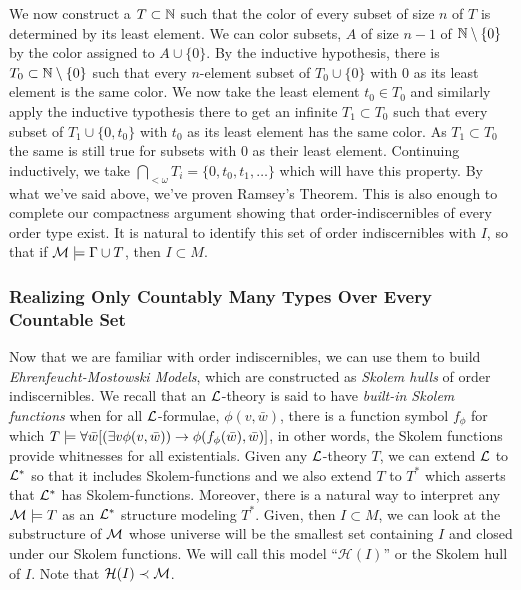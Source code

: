 We now construct a \(T \subset \mathbb{N}\) such that the color of every subset of size \(n\) of \(T\) is determined by its least element. 
We can color subsets, \(A\) of size \(n-1\) of \(\mathbb{N} \setminus \{0\}\) by the color assigned to \(A \cup \{0\}\). 
By the inductive hypothesis, there is \(T_0 \subset \mathbb{N} \setminus \{0\}\) such that every \(n\)-element subset of \(T_0 \cup \{0\}\) with 0 as its least element is the same color. 
We now take the least element \(t_0 \in T_0\) and similarly apply the inductive typothesis there to get an infinite \(T_1 \subset T_0\) such that every subset of \(T_1 \cup \{0, t_0\}\) with \(t_0\) as its least element has the same color. 
As \(T_1 \subset T_0\) the same is still true for subsets with \(0\) as their least element. 
Continuing inductively, we take \(\bigcap_{<\omega}T_i = \{0, t_0, t_1, \ldots\}\) which will have this property. 
By what we've said above, we've proven Ramsey's Theorem. 
This is also enough to complete our compactness argument showing that order-indiscernibles of every order type exist.  
It is natural to identify this set of order indiscernibles with \(I\), so that if \(\mathcal{M} \models \Gamma \cup T\), then \(I \subset M\).

\subsubsection{Realizing Only Countably Many Types Over Every Countable Set}
Now that we are familiar with order indiscernibles, we can use them to build \textit{Ehrenfeucht-Mostowski Models}, which are constructed as \textit{Skolem hulls} of order indiscernibles. 
We recall that an \(\mathcal{L}\)-theory is said to have \textit{built-in Skolem functions} when for all \(\mathcal{L}\)-formulae, \(\phi(v, \bar{w})\), there is a function symbol \(f_\phi\) for which 
\(T \models \forall \bar{w} [(\exists v \phi(v, \bar{w})) \to \phi(f_\phi(\bar{w}), \bar{w})]\), in other words, the Skolem functions provide whitnesses for all existentials. 
Given any \(\mathcal{L}\)-theory \(T\), we can extend \(\mathcal{L}\) to \(\mathcal{L}^*\) so that it includes Skolem-functions and we also extend \(T\) to \(T^*\) which asserts that \(\mathcal{L}^*\) has Skolem-functions. 
Moreover, there is a natural way to interpret any \(\mathcal{M} \models T\) as an \(\mathcal{L}^*\) structure modeling \(T^*\).
Given, then \(I \subset M\), we can look at the substructure of \(\mathcal{M}\) whose universe will be the smallest set containing \(I\) and closed under our Skolem functions. 
We will call this model ``\(\mathcal{H}(I)\)'' or the Skolem hull of \(I\).
Note that \(\mathcal{H}(I) \prec \mathcal{M}\).

